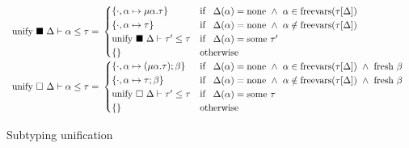 \documentclass[sigplan,screen]{acmart}
\begin{document}
\begin{figure*}[h]
  \[
    \begin{array}{l @{} l @{} l @{} l }
    \text{unify } \blacksquare\ \Delta &{} \vdash \alpha \leq \tau	
    &{}=\ &{} 
      \begin{cases}  
        \{ \cdot,\alpha \mapsto \mu\alpha.\tau \}
        & \text{if } 
        \begin{array}{l}
          \Delta(\alpha) = \text{none} \ \wedge\
          \alpha \in \text{freevars}(\tau[\Delta])
        \end{array}
        \\
        \{ \cdot,\alpha \mapsto \tau \}
        & \text{if } 
        \begin{array}{l}
          \Delta(\alpha) = \text{none} \ \wedge\ 
          \alpha \notin \text{freevars}(\tau[\Delta])
        \end{array}
        \\
        \text{unify } \blacksquare\ \Delta \vdash \tau' \leq \tau
        &\text{if }
        \begin{array}{l}
          \Delta(\alpha) = \text{some } \tau'
        \end{array}
        \\
        \{\}
        &\text{otherwise}
      \end{cases}
    \\
    \text{unify } \square\ \Delta &{} \vdash \alpha \leq \tau	
    &{}=\ &{} 
      \begin{cases}  
        \{ \cdot,\alpha \mapsto (\mu\alpha.\tau);\beta \}
        & \text{if } 
        \begin{array}{l}
          \Delta(\alpha) = \text{none} \ \wedge\ 
          \alpha \in \text{freevars}(\tau[\Delta]) \ \wedge\ 
          \text{fresh } \beta
        \end{array}
        \\
        \{ \cdot,\alpha \mapsto \tau;\beta \}
        & \text{if } 
        \begin{array}{l}
          \Delta(\alpha) = \text{none} \ \wedge\ 
          \alpha \notin \text{freevars}(\tau[\Delta]) \ \wedge\ 
          \text{fresh } \beta
        \end{array}
        \\
        \text{unify } \square\ \Delta \vdash \tau' \leq \tau
        &\text{if }
        \begin{array}{l}
          \Delta(\alpha) = \text{some } \tau
        \end{array}
        \\
        \{\}
        &\text{otherwise}
      \end{cases}
    \end{array}
  \]

  \caption{Subtyping unification}
\end{figure*}
\end{document}
